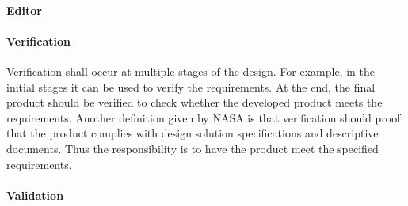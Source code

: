 \paragraph{Editor}

\paragraph{Verification}
Verification shall occur at multiple stages of the design. For example, in the initial stages it can be used to verify the requirements. At the end, the final product should be verified to check whether the developed product meets the requirements. Another definition given by NASA is that verification should proof that the product complies with design solution specifications and descriptive documents. Thus the responsibility is to have the product meet the specified requirements.

\paragraph{Validation}
